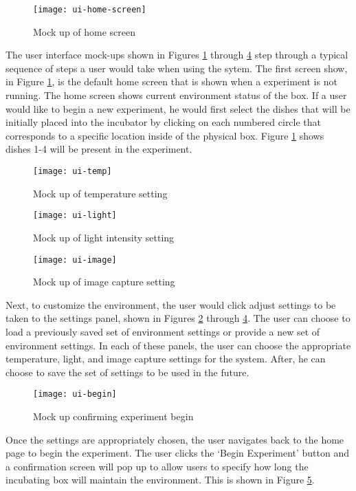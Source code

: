 \begin{figure}[H]
\texttt{[image: ui-home-screen]}
\caption{\label{figure:ui-home} Mock up of home screen}
\end{figure}

The user interface mock-ups shown in Figures \ref{figure:ui-home} through \ref{figure:ui-image} step through a typical sequence of steps a user would take when using the sytem. The first screen show, in Figure \ref{figure:ui-home}, is the default home screen that is shown when a experiment is not running. The home screen shows current environment status of the box. If a user would like to begin a new experiment, he would first select the dishes that will be initially placed into the incubator by clicking on each numbered circle that corresponds to a specific location inside of the physical box. Figure \ref{figure:ui-home} shows dishes 1-4 will be present in the experiment. 

\begin{figure}[H]
\texttt{[image: ui-temp]}
\caption{\label{figure:ui-temp} Mock up of temperature setting}

\end{figure}

\begin{figure}[H]
\texttt{[image: ui-light]}
\caption{\label{figure:ui-light} Mock up of light intensity setting}
\end{figure}

\begin{figure}[H]
\texttt{[image: ui-image]}
\caption{\label{figure:ui-image} Mock up of image capture setting}
\end{figure}


Next, to customize the environment, the user would click adjust settings to be taken to the settings panel, shown in Figures \ref{figure:ui-temp} through \ref{figure:ui-image}. The user can choose to load a previously saved set of environment settings or provide a new set of environment settings. In each of these panels, the user can choose the appropriate temperature, light, and image capture settings for the system. After, he can choose to save the set of settings to be used in the future. 

\begin{figure}[H]
\texttt{[image: ui-begin]}
\caption{\label{figure:ui-begin} Mock up confirming experiment begin }
\end{figure}


Once the settings are appropriately chosen, the user navigates back to the home page to begin the experiment. The user clicks the `Begin Experiment' button and a confirmation screen will pop up to allow users to specify how long the incubating box will maintain the environment. This is shown in Figure \ref{figure:ui-begin}.


